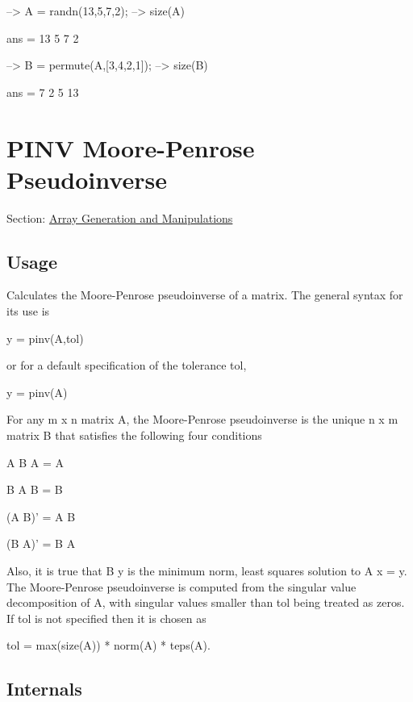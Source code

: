 \begin{DoxyVerbInclude}
--> A = randn(13,5,7,2);
--> size(A)

ans = 
 13  5  7  2 

--> B = permute(A,[3,4,2,1]);
--> size(B)

ans = 
  7  2  5 13 
\end{DoxyVerbInclude}
 \hypertarget{array_pinv}{}\section{P\-I\-N\-V Moore-\/\-Penrose Pseudoinverse}\label{array_pinv}
Section\-: \hyperlink{sec_array}{Array Generation and Manipulations} \hypertarget{vtkwidgets_vtkxyplotwidget_Usage}{}\subsection{Usage}\label{vtkwidgets_vtkxyplotwidget_Usage}
Calculates the Moore-\/\-Penrose pseudoinverse of a matrix. The general syntax for its use is \begin{DoxyVerb}   y = pinv(A,tol)
\end{DoxyVerb}
 or for a default specification of the tolerance {\ttfamily tol}, \begin{DoxyVerb}   y = pinv(A)
\end{DoxyVerb}
 For any {\ttfamily m x n} matrix {\ttfamily A}, the Moore-\/\-Penrose pseudoinverse is the unique {\ttfamily n x m} matrix {\ttfamily B} that satisfies the following four conditions 
\begin{DoxyItemize}
\item {\ttfamily A B A = A}  
\item {\ttfamily B A B = B}  
\item {\ttfamily (A B)' = A B}  
\item {\ttfamily (B A)' = B A}  
\end{DoxyItemize}Also, it is true that {\ttfamily B y} is the minimum norm, least squares solution to {\ttfamily A x = y}. The Moore-\/\-Penrose pseudoinverse is computed from the singular value decomposition of {\ttfamily A}, with singular values smaller than {\ttfamily tol} being treated as zeros. If {\ttfamily tol} is not specified then it is chosen as \begin{DoxyVerb}  tol = max(size(A)) * norm(A) * teps(A).
\end{DoxyVerb}
 \hypertarget{transforms_svd_Function}{}\subsection{Internals}\label{transforms_svd_Function}
